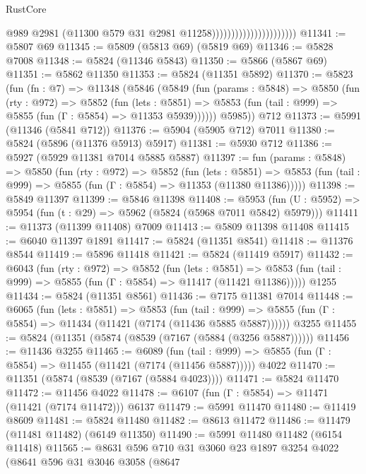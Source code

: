 \begin{lexlean}{RustCore}
\begin{coremodule}
                                              @989
                                              @2981
                                              (@11300 @579 @31 @2981 @11258))))))))))))))))))))))
@11341 := @5807 @69
@11345 := @5809 (@5813 @69) (@5819 @69)
@11346 := @5828 @7008
@11348 := @5824 (@11346 @5843)
@11350 := @5866 (@5867 @69)
@11351 := @5862 @11350
@11353 := @5824 (@11351 @5892)
@11370 := @5823
    (fun (fn : @7) =>
    @11348
      (@5846
        (@5849
          (fun (params : @5848) =>
          @5850
            (fun (rty : @972) =>
            @5852
              (fun (lets : @5851) =>
              @5853 (fun (tail : @999) => @5855 (fun (Γ : @5854) => @11353 @5939))))))
        @5985))
    @712
@11373 := @5991 (@11346 (@5841 @712))
@11376 := @5904 (@5905 @712) @7011
@11380 := @5824 (@5896 (@11376 @5913) @5917)
@11381 := @5930 @712
@11386 := @5927 (@5929 @11381 @7014 @5885 @5887)
@11397 := fun (params : @5848) =>
  @5850
    (fun (rty : @972) =>
    @5852
      (fun (lets : @5851) =>
      @5853 (fun (tail : @999) => @5855 (fun (Γ : @5854) => @11353 (@11380 @11386)))))
@11398 := @5849 @11397
@11399 := @5846 @11398
@11408 := @5953
    (fun (U : @5952) => @5954 (fun (t : @29) => @5962 (@5824 (@5968 @7011 @5842) @5979)))
@11411 := @11373 (@11399 @11408) @7009
@11413 := @5809 @11398 @11408
@11415 := @6040 @11397 @1891
@11417 := @5824 (@11351 @8541)
@11418 := @11376 @8544
@11419 := @5896 @11418
@11421 := @5824 (@11419 @5917)
@11432 := @6043
    (fun (rty : @972) =>
    @5852
      (fun (lets : @5851) =>
      @5853 (fun (tail : @999) => @5855 (fun (Γ : @5854) => @11417 (@11421 @11386)))))
    @1255
@11434 := @5824 (@11351 @8561)
@11436 := @7175 @11381 @7014
@11448 := @6065
    (fun (lets : @5851) =>
    @5853
      (fun (tail : @999) =>
      @5855 (fun (Γ : @5854) => @11434 (@11421 (@7174 (@11436 @5885 @5887))))))
    @3255
@11455 := @5824 (@11351 (@5874 (@8539 (@7167 (@5884 (@3256 @5887))))))
@11456 := @11436 @3255
@11465 := @6089
    (fun (tail : @999) => @5855 (fun (Γ : @5854) => @11455 (@11421 (@7174 (@11456 @5887)))))
    @4022
@11470 := @11351 (@5874 (@8539 (@7167 (@5884 @4023))))
@11471 := @5824 @11470
@11472 := @11456 @4022
@11478 := @6107 (fun (Γ : @5854) => @11471 (@11421 (@7174 @11472))) @6137
@11479 := @5991 @11470
@11480 := @11419 @8609
@11481 := @5824 @11480
@11482 := @8613 @11472
@11486 := @11479 (@11481 @11482) (@6149 @11350)
@11490 := @5991 @11480 @11482 (@6154 @11418)
@11565 := @8631
    @596
    @710
    @31
    @3060
    @23
    @1897
    @3254
    @4022
    (@8641
      @596
      @31
      @3046
      @3058
      (@8647

\end{coremodule}
\end{lexlean}
